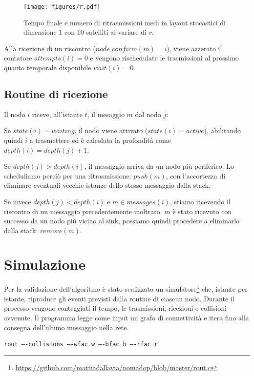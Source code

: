 \documentclass[a4paper,12pt]{article}
\theoremstyle{definition}
\begin{document}
\begin{figure}[H]
\centering
\texttt{[image: figures/r.pdf]}
\caption{Tempo finale e numero di ritrasmissioni medi in layout stocastici di dimensione 1 con 10 satelliti al variare di $r$.}
\end{figure}

Alla ricezione di un riscontro ($node\_confirm(m) = i$), viene azzerato il contatore $attempts(i) = 0$ e vengono rischedulate le trasmissioni al prossimo quanto temporale disponibile $wait(i) = 0$.

\subsection{Routine di ricezione}

Il nodo $i$ riceve, all'istante $t$, il mesaggio $m$ dal nodo $j$:

Se $state(i) = waiting$, il nodo viene attivato ($state(i) = active$), abilitando quindi $i$ a trasmettere ed è calcolata la profondità come $depth(i) = depth(j)+1$.

Se $depth(j) > depth(i)$, il messaggio arriva da un nodo più periferico. Lo scheduliamo perciò per una ritrasmissione: $push(m)$, con l'accortezza di eliminare eventuali vecchie istanze dello stesso messaggio dalla stack.

Se invece $depth(j) < depth(i)$ e $m \in messages(i)$, stiamo ricevendo il riscontro di un messaggio precedentemente inoltrato. $m$ è stato ricevuto con successo da un nodo più vicino al sink, possiamo quindi procedere a eliminarlo dalla stack: $remove(m)$.

\section{Simulazione}
\label{simulazione}


Per la validazione dell'algoritmo è stato realizzato un simulatore\footnote{\url{https://github.com/mattiadallavia/nomadop/blob/master/rout.c}} che, istante per istante, riproduce gli eventi previsti dalla routine di ciascun nodo. Durante il processo vengono conteggiati il tempo, le trasmissioni, ricezioni e collisioni avvenute. Il programma legge come input un grafo di connettività e itera fino alla consegna dell'ultimo messaggio nella rete.

{\centering
\texttt{rout ----collisions ----wfac w ----bfac b ----rfac r}

}
\end{document}
